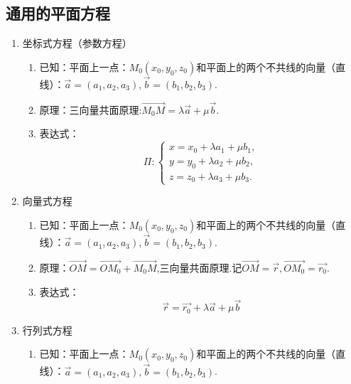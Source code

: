 \subsection{通用的平面方程}
\begin{enumerate}[\large1.]
	\item {\color{dy}\large 坐标式方程（参数方程）}
	\begin{enumerate}[]
		\item 已知：{\color{dl}平面上一点}：$M_0(x_0,y_0,z_0)$和平面上的{\color{dl}两个不共线的向量（直线）}：$\overrightarrow{a}=(a_1,a_2,a_3),\overrightarrow{b}=(b_1,b_2,b_3)$.
		\item 原理：三向量共面原理:$\overrightarrow{M_0M}=\lambda \overrightarrow{a}+\mu \overrightarrow{b}$.
		\item 表达式：
		\begin{equation}
		\Pi: \begin{cases}
		x=x_0+\lambda a_1+\mu b_1,\\
		y=y_0+\lambda a_2+\mu b_2,\\
		z=z_0+\lambda a_3+\mu b_3.
		\end{cases}
		\end{equation}
	\end{enumerate}
	\item {\color{dy}\large 向量式方程}
	\begin{enumerate}[]
		\item 已知：{\color{dl}平面上一点}：$M_0(x_0,y_0,z_0)$和平面上的{\color{dl}两个不共线的向量（直线）}：$\overrightarrow{a}=(a_1,a_2,a_3),\overrightarrow{b}=(b_1,b_2,b_3)$.
		\item 原理：$\overrightarrow{OM}=\overrightarrow{OM_0}+\overrightarrow{M_0M}$,三向量共面原理.记$\overrightarrow{OM}=\overrightarrow{r},\overrightarrow{OM_0}=\overrightarrow{r_0}$.
		\item 表达式：
		\begin{equation}
		\overrightarrow{r}=\overrightarrow{r_0}+\lambda \overrightarrow{a}+\mu \overrightarrow{b}
		\end{equation}
	\end{enumerate}
	\item {\color{dy}\large 行列式方程}
	\begin{enumerate}[]
		\item 已知：{\color{dl}平面上一点}：$M_0(x_0,y_0,z_0)$和平面上的{\color{dl}两个不共线的向量（直线）}：$\overrightarrow{a}=(a_1,a_2,a_3),\overrightarrow{b}=(b_1,b_2,b_3)$.

\end{enumerate}
\end{enumerate}
